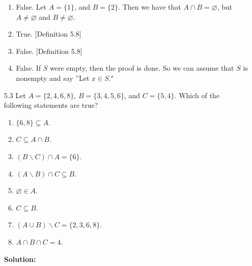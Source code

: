 \begin{enumerate}
      \begin{enumerate}
         \item False. Let $A = \{1\}$, and $B = \{2\}$. Then we have that
               $A \cap B = \varnothing$, but $A \neq \varnothing$ and
               $B \neq \varnothing$.
         \item True.  [Definition 5.8]
         \item False. [Definition 5.8]
         \item False. If $S$ were empty, then the proof is done. So we can
               assume that $S$ is nonempty and say ''Let $x \in S$."
      \end{enumerate}
   \item[5.3]  Let $A = \{2, 4, 6, 8\}$, $B = \{3, 4, 5, 6\}$, and
               $C = \{5, 4\}$. Which of the following statements are true?
               \begin{enumerate}
                  \item $\{6, 8\} \subseteq A$.
                  \item $C \subseteq A \cap B$.
                  \item $(B{\backslash}C) \cap A = \{6\}$.
                  \item $(A{\backslash}B) \cap C \subseteq B$.
                  \item $\varnothing \in A$.
                  \item $C \subseteq B$.
                  \item $(A \cup B){\backslash}C = \{2, 3, 6, 8\}$.
                  \item $A \cap B \cap C = 4$.
               \end{enumerate}
               
      \textbf{Solution:}
      

\end{enumerate}
